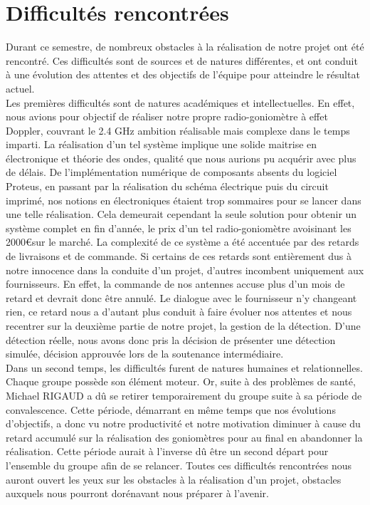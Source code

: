 
\chapter{Difficultés rencontrées}
\label{chap:difficulte}

Durant ce semestre, de nombreux obstacles à la réalisation de notre projet ont été rencontré. Ces difficultés sont de sources et de natures différentes, et ont conduit à une évolution des attentes et des objectifs de l’équipe pour atteindre le résultat actuel.~\\

Les premières difficultés sont de natures académiques et intellectuelles. En effet, nous avions pour objectif de réaliser notre propre radio-goniomètre à effet Doppler, couvrant le 2.4 GHz ambition réalisable mais complexe dans le temps imparti. La réalisation d’un tel système implique une solide maitrise en électronique et théorie des ondes, qualité que nous aurions pu acquérir avec plus de délais. De l’implémentation numérique de composants absents du logiciel Proteus, en passant par la réalisation du schéma électrique puis du circuit imprimé, nos notions en électroniques étaient trop sommaires pour se lancer dans une telle réalisation. Cela demeurait cependant la seule solution pour obtenir un système complet en fin d’année, le prix d’un tel radio-goniomètre avoisinant les 2000\euro sur le marché. 
La complexité de ce système a été accentuée par des retards de livraisons et de commande. Si certains de ces retards sont entièrement dus à notre innocence dans la conduite d’un projet, d’autres incombent uniquement aux fournisseurs. En effet, la commande de nos antennes accuse plus d’un mois de retard et devrait donc être annulé. Le dialogue avec le fournisseur n’y changeant rien, ce retard nous a d’autant plus conduit à faire évoluer nos attentes et nous recentrer sur la deuxième partie de notre projet, la gestion de la détection. D’une détection réelle, nous avons donc pris la décision de présenter une détection simulée, décision approuvée lors de la soutenance intermédiaire. 
~\\

Dans un second temps, les difficultés furent de natures humaines et relationnelles. Chaque groupe possède son élément moteur. Or, suite à des problèmes de santé, Michael RIGAUD a dû se retirer temporairement du groupe suite à sa période de convalescence. Cette période, démarrant en même temps que nos évolutions d’objectifs, a donc vu notre productivité et notre motivation diminuer à cause du retard accumulé sur la réalisation des goniomètres pour au final en abandonner la réalisation. Cette période aurait à l’inverse dû être un second départ pour l’ensemble du groupe afin de se relancer. 
Toutes ces difficultés rencontrées nous auront ouvert les yeux sur les obstacles à la réalisation d’un projet, obstacles auxquels nous pourront dorénavant nous préparer à l’avenir.


